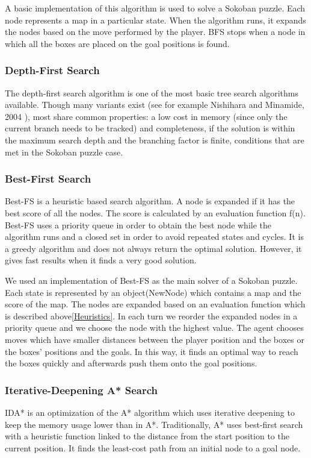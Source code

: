 A basic implementation of this algorithm is used to solve a Sokoban puzzle. Each node represents a map in a particular state. When the algorithm runs, it expands the nodes based on the move performed by the player. BFS stops when a node in which all the boxes are placed on the goal positions is found. 

\subsubsection{Depth-First Search}
The depth-first search algorithm is one of the most basic tree search algorithms available. Though many variants exist (see for example Nishihara and Minamide, 2004 \cite{nishihara2004depth}), most share common properties: a low cost in memory (since only the current branch needs to be tracked) and completeness, if the solution is within the maximum search depth and the branching factor is finite, conditions that are met in the Sokoban puzzle case.

\subsubsection{Best-First Search}
Best-FS is a heuristic based search algorithm. A node is expanded if it has the best score of all the nodes. The score is calculated by an evaluation function f(n). Best-FS uses a priority queue in order to obtain the best node while the algorithm runs and a closed set in order to avoid repeated states and cycles. It is a greedy algorithm and does not always return the optimal solution. However, it gives fast results when it finds a very good solution.\cite{korf1993linear}

We used an implementation of Best-FS as the main solver of a Sokoban puzzle. Each state is represented by an object(NewNode) which contains a map and the score of the map. The nodes are expanded based on an evaluation function which is described above\ref{Heuristics}. In each turn we reorder the expanded nodes in a priority queue and we choose the node with the highest value. The agent chooses moves which have smaller distances between the player position and the boxes or the boxes' positions and the goals. In this way, it finds an optimal way to reach the boxes quickly and afterwards push them onto the goal positions.

\subsubsection{Iterative-Deepening A* Search}
IDA* is an optimization of the A* algorithm which uses iterative deepening to keep the memory usage lower than in A*. Traditionally, A* uses best-first search with a heuristic function linked to the distance from the start position to the current position. It finds the least-cost path from an initial node to a goal node.\cite{stout1996smart}

